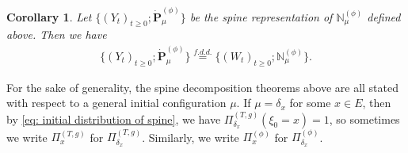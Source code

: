 \documentclass[12pt,a4paper]{amsart}
\newtheorem{cro}[thm]{Corollary}
\theoremstyle{definition}
\numberwithin{equation}{section}
\begin{document}
\begin{cro}
	Let $\{(Y_t)_{t\geq 0}; \dot {\mathbf P}^{(\phi)}_\mu\}$ be the spine representation of $\mathbb N^{(\phi)}_\mu$ defined above.
	Then we have 
  \begin{align}
    \{(Y_t)_{t\geq 0}; \dot{\mathbf P}^{(\phi)}_\mu\}
    \overset{f.d.d.}{=} \{(W_t)_{t\geq 0}; \mathbb N_\mu^{(\phi)}\}.
  \end{align}
\end{cro}

For the sake of generality, the spine decomposition theorems above are all stated with respect to a general initial configuration $\mu$.
If $\mu = \delta_x$ for some $x\in E$, then by \eqref{eq: initial distribution of spine}, we have $\Pi_{\delta_x}^{(T,g)} (\xi_0 = x) = 1$, so sometimes we write $\Pi_x^{(T,g)}$ for $\Pi_{\delta_x}^{(T,g)}$.
Similarly, we write $\Pi_x^{(\phi)}$ for $\Pi_{\delta_x}^{(\phi)}$.

\end{document}
